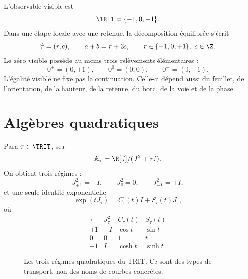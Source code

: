 L'observable visible est
\[
 \TRIT=\{-1,0,+1\}.
\]
Dans une étape locale avec une retenue, la décomposition équilibrée s'écrit
\[
 \widehat\tau=(r,c),\qquad a+b=r+3c,
 \qquad r\in\{-1,0,+1\},\ c\in\Z.
\]
Le zéro visible possède au moins trois relèvements élémentaires :
\[
 0^+=(0,+1),\qquad0^0=(0,0),\qquad0^-=(0,-1).
\]
L'égalité visible ne fixe pas la continuation. Celle-ci dépend aussi du feuillet, de l'orientation, de la hauteur, de la retenue, du bord, de la voie et de la phase.

\section{Algèbres quadratiques}

Para \(\tau\in\TRIT\), sea
\[
 \mathbb A_\tau=\R[J]/(J^2+\tau I).
\]
On obtient trois régimes :
\[
 J_{+1}^2=-I,\qquad J_0^2=0,\qquad J_{-1}^2=+I,
\]
et une seule identité exponentielle
\[
 \exp(tJ_\tau)=C_\tau(t)I+S_\tau(t)J_\tau,
\]
où
\[
\begin{array}{c|c|c|c}
\tau & J_\tau^2 & C_\tau(t)&S_\tau(t)\\ \hline
+1&-I&\cos t&\sin t\\
0&0&1&t\\
-1&I&\cosh t&\sinh t
\end{array}
\]

\begin{figure}[htbp]
\centering
{}
\caption{Les trois régimes quadratiques du TRIT. Ce sont des types de transport, non des noms de courbes concrètes.}
\label{espiral:fig:trit-regimenes}
\end{figure}

